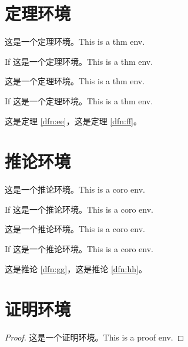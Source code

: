 \documentclass[UTF8,space=auto]{ctexart} %
\begin{document}
\section{定理环境}

\lipsum[1][1-3]

\begin{thm}\label{dfn:ee}%
	这是一个定理环境。This is a thm env.
\end{thm}

\begin{thm}
	If 这是一个定理环境。This is a thm env.
\end{thm}

\begin{thm}[xx 定理]
	这是一个定理环境。This is a thm env.
\end{thm}

\begin{thm}[xx 定理]\label{dfn:ff}%
	If 这是一个定理环境。This is a thm env.
\end{thm}

\lipsum[1][1-3]

这是定理 \ref{dfn:ee}，这是定理 \ref{dfn:ff}。


\section{推论环境}

\lipsum[1][1-3]

\begin{coro}\label{dfn:gg}%
	这是一个推论环境。This is a coro env.
\end{coro}

\begin{coro}
	If 这是一个推论环境。This is a coro env.
\end{coro}

\begin{coro}[xx 推论]
	这是一个推论环境。This is a coro env.
\end{coro}

\begin{coro}[xx 推论]\label{dfn:hh}%
	If 这是一个推论环境。This is a coro env.
\end{coro}

\lipsum[1][1-3]

这是推论 \ref{dfn:gg}，这是推论 \ref{dfn:hh}。


\section{证明环境}
\lipsum[1][1-3]
\begin{proof}
	这是一个证明环境。This is a proof env.
\end{proof}
\end{document}
